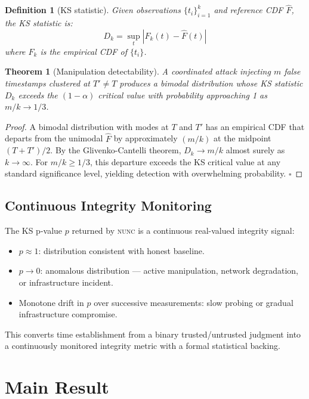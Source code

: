 \documentclass[11pt,twocolumn]{article}
\newtheorem{theorem}{Theorem}
\newtheorem{definition}{Definition}
\begin{document}
\begin{definition}[KS statistic]
  Given observations $\{t_i\}_{i=1}^k$ and reference CDF $\hat{F}$, the KS
  statistic is:
  \[
    D_k = \sup_t \left| F_k(t) - \hat{F}(t) \right|
  \]
  where $F_k$ is the empirical CDF of $\{t_i\}$.
\end{definition}

\begin{theorem}[Manipulation detectability]
  A coordinated attack injecting $m$ false timestamps clustered at $T' \neq T$
  produces a bimodal distribution whose KS statistic $D_k$ exceeds the
  $(1-\alpha)$ critical value with probability approaching 1 as
  $m/k \to 1/3$.
\end{theorem}

\begin{proof}
  A bimodal distribution with modes at $T$ and $T'$ has an empirical CDF that
  departs from the unimodal $\hat{F}$ by approximately $(m/k)$ at the
  midpoint $(T+T')/2$.  By the Glivenko-Cantelli theorem, $D_k \to m/k$
  almost surely as $k \to \infty$.  For $m/k \geq 1/3$, this departure
  exceeds the KS critical value at any standard significance level, yielding
  detection with overwhelming probability.  $\square$
\end{proof}

\subsection{Continuous Integrity Monitoring}

The KS p-value $p$ returned by \textsc{nunc} is a continuous real-valued
integrity signal:

\begin{itemize}
  \item $p \approx 1$: distribution consistent with honest baseline.
  \item $p \to 0$: anomalous distribution — active manipulation, network
        degradation, or infrastructure incident.
  \item Monotone drift in $p$ over successive measurements: slow probing or
        gradual infrastructure compromise.
\end{itemize}

This converts time establishment from a binary trusted/untrusted judgment into
a continuously monitored integrity metric with a formal statistical backing.

\section{Main Result}
\end{document}
